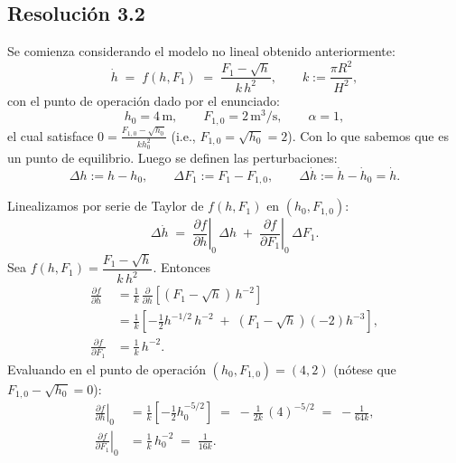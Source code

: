 \documentclass[
  11pt,
  letterpaper,
   addpoints,
   answers
  ]{exam}
\begin{document}
\begin{questions}
\begin{solution}
   \subsection*{Resolución 3.2}
Se comienza considerando el modelo no lineal obtenido anteriormente:
\begin{equation}
    \dot h \;=\; f(h,F_1) \;=\; \frac{F_1 - \sqrt{h}}{k\,h^2},
    \qquad k := \frac{\pi R^2}{H^2},
\end{equation}
con el punto de operación dado por el enunciado:
\begin{equation}
    h_0 = 4\,\text{m}, 
    \qquad F_{1,0} = 2\,\text{m}^3/\text{s},
    \qquad \alpha=1,
\end{equation}
el cual satisface $0 = \frac{F_{1,0}-\sqrt{h_0}}{k h_0^2}$ (i.e., $F_{1,0}=\sqrt{h_0}=2$). Con lo que sabemos que es un punto de equilibrio. Luego se definen las perturbaciones:
\begin{equation}
    \Delta h := h - h_0,
    \qquad
    \Delta F_1 := F_1 - F_{1,0},
    \qquad
    \Delta \dot h := \dot h - \dot h_0 =\dot h.
\end{equation}

Linealizamos por serie de Taylor de $f(h,F_1)$ en $(h_0,F_{1,0})$:
\begin{equation}
    \Delta \dot h 
    \;=\; 
    \left.\frac{\partial f}{\partial h}\right|_{0}\,\Delta h
    \;+\;
    \left.\frac{\partial f}{\partial F_1}\right|_{0}\,\Delta F_1 .
\end{equation}
Sea $f(h,F_1) = \dfrac{F_1 - \sqrt{h}}{k\,h^2}$. Entonces
\begin{align}
    \frac{\partial f}{\partial h}
    &= \frac{1}{k}\,\frac{\partial}{\partial h}\!\left[(F_1-\sqrt{h})\,h^{-2}\right] \nonumber\\
    &= \frac{1}{k}\left[ -\frac{1}{2}h^{-1/2}\,h^{-2} \;+\; (F_1-\sqrt{h})(-2)h^{-3}\right],\\[0.25em]
    \frac{\partial f}{\partial F_1}
    &= \frac{1}{k}\,h^{-2}.
\end{align}
Evaluando en el punto de operación $(h_0,F_{1,0})=(4,2)$ (nótese que $F_{1,0}-\sqrt{h_0}=0$):
\begin{align}
    \left.\frac{\partial f}{\partial h}\right|_0
    &= \frac{1}{k}\left[-\frac{1}{2}h_0^{-5/2}\right]
    \;=\; -\frac{1}{2k}\,(4)^{-5/2}
    \;=\; -\frac{1}{64k},\\
    \left.\frac{\partial f}{\partial F_1}\right|_0
    &= \frac{1}{k}\,h_0^{-2}
    \;=\; \frac{1}{16k}.
\end{align}


\end{solution}
\end{questions}
\end{document}
